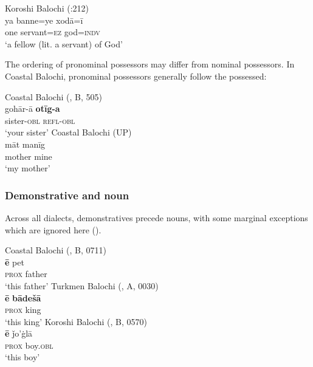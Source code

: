 \documentclass[output=paper,colorlinks,citecolor=brown,draftmode]{langscibook}
\begin{document}
\ea\label{Balochi:ex:4}
Koroshi Balochi (\citealt{nourzaei_koroshi_2015}:212)\\
\gll ya banne=ye xodā=ī \\
one servant=\textsc{ez} god=\textsc{indv} \\
\glt `a fellow (lit. a servant) of God'
\z

The ordering of pronominal possessors may differ from nominal possessors. In Coastal  Balochi, pronominal possessors generally follow the possessed: 

\ea\label{Balochi:ex:5}
\ea\label{Balochi:ex:5a}
Coastal Balochi (\citealt{nourzaei_balochi_coastal_2021}, B, 505)\\
\gll gohār-ā \textbf{otīg-a} \\
sister-\textsc{obl} \textsc{refl}-\textsc{obl} \\
\glt `your sister'
\ex\label{Balochi:ex:5b}
Coastal Balochi (UP)\\
\gll māt manīg \\
mother mine \\
\glt `my mother'
\z
\z

\subsubsection{Demonstrative and noun}\label{Balochi:ss:3.2.3}

Across all dialects, demonstratives precede nouns, with some marginal exceptions which are ignored here (\citealt{korn_notes_2019}).

\ea\label{Balochi:ex:6}
\ea\label{Balochi:ex:6a}
Coastal Balochi (\citealt{nourzaei_balochi_coastal_2021}, B, 0711)\\
\gll \textbf{ē} pet \\
\textsc{prox} father \\
\glt `this father'
\ex\label{Balochi:ex:6b}
Turkmen Balochi (\citealt{haig_balochi_2022}, A, 0030)\\
\gll \textbf{ē} \textbf{bādešā} \\
\textsc{prox} king \\
\glt `this king'
\ex\label{Balochi:ex:6c}
Koroshi Balochi (\citealt{nourzaei_balochi_koroshi_2021}, B, 0570)\\
\gll \textbf{ē} ǰo'ġlā \\
\textsc{prox} boy.\textsc{obl} \\
\glt `this boy'
\z
\z
\end{document}
